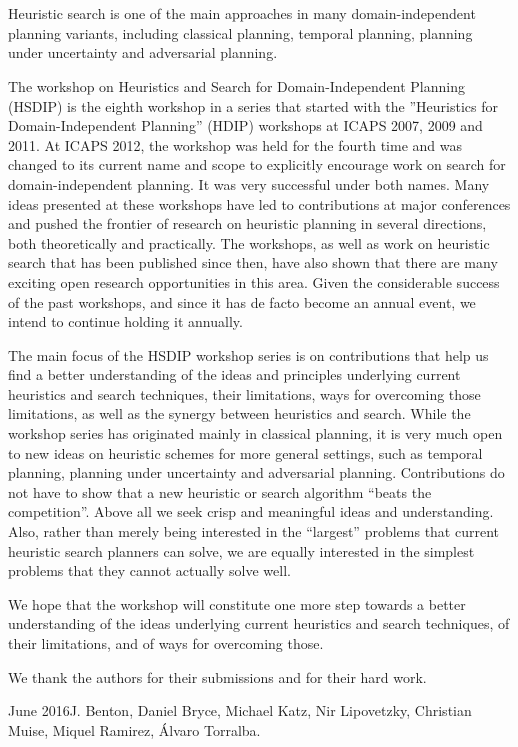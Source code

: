 \section*{}


Heuristic search is one of the main approaches in many
domain-independent planning variants, including classical planning,
temporal planning, planning under uncertainty and adversarial
planning.

The workshop on Heuristics and Search for Domain-Independent Planning
(HSDIP) is the eighth workshop in a series that started with the
”Heuristics for Domain-Independent Planning” (HDIP) workshops at ICAPS
2007, 2009 and 2011. At ICAPS 2012, the workshop was held for the
fourth time and was changed to its current name and scope to
explicitly encourage work on search for domain-independent planning.
It was very successful under both names. Many ideas presented at these
workshops have led to contributions at major conferences and pushed
the frontier of research on heuristic planning in several directions,
both theoretically and practically. The workshops, as well as work on
heuristic search that has been published since then, have also shown
that there are many exciting open research opportunities in this area.
Given the considerable success of the past workshops, and since it has
de facto become an annual event, we intend to continue holding it
annually.

The main focus of the HSDIP workshop series is on contributions that
help us find a better understanding of the ideas and principles
underlying current heuristics and search techniques, their
limitations, ways for overcoming those limitations, as well as the
synergy between heuristics and search. While the workshop series has
originated mainly in classical planning, it is very much open to new
ideas on heuristic schemes for more general settings, such as temporal
planning, planning under uncertainty and adversarial
planning. Contributions do not have to show that a new heuristic or
search algorithm ``beats the competition''. Above all we seek crisp
and meaningful ideas and understanding. Also, rather than merely being
interested in the ``largest'' problems that current heuristic search
planners can solve, we are equally interested in the simplest problems
that they cannot actually solve well.

We hope that the workshop will constitute one more step towards a
better understanding of the ideas underlying current heuristics and search
techniques, of their limitations, and of ways for overcoming those.

\bigskip
\noindent
We thank the authors for their submissions and for their hard work.

\vspace{0.5cm}
\begin{flushright}\noindent
  June 2016\hfill J. Benton, Daniel Bryce, Michael Katz, Nir Lipovetzky, Christian Muise, Miquel Ramirez, {\'A}lvaro Torralba.
\end{flushright}
